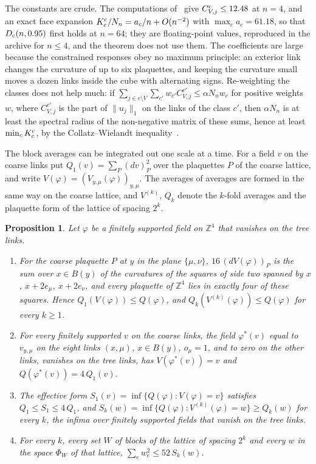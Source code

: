 \documentclass[11pt]{amsart}
\newtheorem{proposition}[theorem]{Proposition}
\theoremstyle{definition}
\theoremstyle{remark}
\numberwithin{equation}{section}
\newcommand{\Z}{\mathbb{Z}}
\begin{document}
The constants are crude. The computations of~\cite{Loc26} give $C^{\rm
c}_{V,j}\le12.48$ at $n=4$, and an exact face expansion $K^{\rm c}_c/N_n=
a_c/n+O(n^{-2})$ with $\max_ca_c=61.18$, so that $D_{\rm c}(n,0.95)$ first
holds at $n=64$; they are floating-point values, reproduced in the archive
for $n\le4$, and the theorem does not use them. The coefficients are large
because the constrained responses obey no maximum principle: an exterior
link changes the curvature of up to six plaquettes, and keeping the
curvature small moves a dozen links inside the cube with alternating signs.
Re-weighting the classes does not help much: if $\sum_{j\in c\setminus V}
\sum_{c'}w_{c'}C^{c'}_{V,j}\le\alpha N_nw_c$ for positive weights $w$, where
$C^{c'}_{V,j}$ is the part of $\|u_j\|_1$ on the links of the class $c'$,
then $\alpha N_n$ is at least the spectral radius of the non-negative matrix
of these sums, hence at least $\min_cK^{\rm c}_c$, by the Collatz--Wielandt
inequality~\cite{Loc26}.

The block averages can be integrated out one scale at a time. For a field
$v$ on the coarse links put $Q_1(v)=\sum_P(dv)_P^2$ over the plaquettes $P$
of the coarse lattice, and write $V(\varphi)=(V_{y,\mu}(\varphi))_{y,\mu}$.
The averages of averages are formed in the same way on the coarse lattice,
and $V^{(k)}$, $Q_k$ denote the $k$-fold averages and the plaquette form of
the lattice of spacing $2^k$.

\begin{proposition}\label{prop:effective}
Let $\varphi$ be a finitely supported field on $\Z^4$ that vanishes on the
tree links.
\begin{enumerate}[label=\textup{(\roman*)},leftmargin=*]
\item For the coarse plaquette $P$ at $y$ in the plane $\{\mu,\nu\}$,
$16\,(dV(\varphi))_P$ is the sum over $x\in B(y)$ of the curvatures of the
squares of side two spanned by $x$, $x+2e_\mu$, $x+2e_\nu$, and every
plaquette of $\Z^4$ lies in exactly four of these squares. Hence $Q_1(V(
\varphi))\le Q(\varphi)$, and $Q_k(V^{(k)}(\varphi))\le Q(\varphi)$ for
every $k\ge1$.
\item For every finitely supported $v$ on the coarse links, the field
$\varphi^*(v)$ equal to $v_{y,\mu}$ on the eight links $(x,\mu)$, $x\in B(y)$,
$o_\mu=1$, and to zero on the other links, vanishes on the tree links, has
$V(\varphi^*(v))=v$ and $Q(\varphi^*(v))=4\,Q_1(v)$.
\item The effective form $S_1(v)=\inf\{Q(\varphi):V(\varphi)=v\}$ satisfies
$Q_1\le S_1\le4\,Q_1$, and $S_k(w)=\inf\{Q(\varphi):V^{(k)}(\varphi)=w\}
\ge Q_k(w)$ for every $k$, the infima over finitely supported fields that
vanish on the tree links.
\item For every $k$, every set $W$ of blocks of the lattice of spacing
$2^k$ and every $w$ in the space $\Phi_W$ of that lattice, $\sum_ew_e^2\le
52\,S_k(w)$.
\end{enumerate}
\end{proposition}
\end{document}
